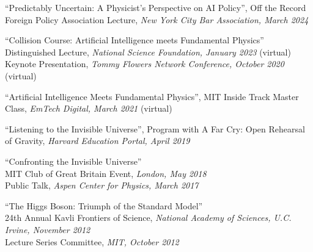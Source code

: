 \bbl

\item ``Predictably Uncertain: A Physicist’s Perspective on AI Policy'', Off the Record Foreign Policy Association Lecture, \emph{New York City Bar Association, March 2024}

\item ``Collision Course: Artificial Intelligence meets Fundamental Physics''
\\ Distinguished Lecture, \emph{National Science Foundation, January 2023} (virtual)
\\ Keynote Presentation, \emph{Tommy Flowers Network Conference, October 2020} (virtual)

\item ``Artificial Intelligence Meets Fundamental Physics'', MIT Inside Track Master Class, \emph{EmTech Digital, March 2021} (virtual)

\item ``Listening to the Invisible Universe'', Program with A Far Cry: Open Rehearsal of Gravity, \emph{Harvard Education Portal, April 2019}

\item ``Confronting the Invisible Universe''
\\ MIT Club of Great Britain Event, \emph{London, May 2018}
\\ Public Talk, \emph{Aspen Center for Physics, March 2017}

\item ``The Higgs Boson:  Triumph of the Standard Model''
\\ 24th Annual Kavli Frontiers of Science, \emph{National Academy of Sciences, U.C. Irvine, November 2012}
\\ Lecture Series Committee, \emph{MIT, October 2012}

\el
